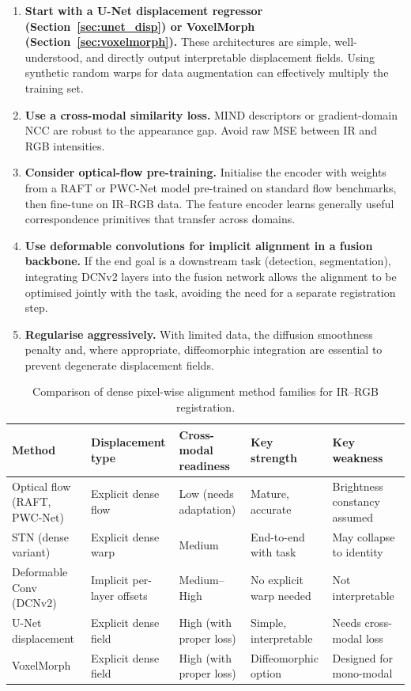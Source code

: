 \begin{enumerate}
    \item \textbf{Start with a U-Net displacement regressor
          (Section~\ref{sec:unet_disp}) or VoxelMorph
          (Section~\ref{sec:voxelmorph}).}  These architectures are
          simple, well-understood, and directly output interpretable
          displacement fields.  Using synthetic random warps for data
          augmentation can effectively multiply the training set.
    \item \textbf{Use a cross-modal similarity loss.}  MIND descriptors
          or gradient-domain NCC are robust to the appearance gap.
          Avoid raw MSE between IR and RGB intensities.
    \item \textbf{Consider optical-flow pre-training.}  Initialise the
          encoder with weights from a RAFT or PWC-Net model pre-trained
          on standard flow benchmarks, then fine-tune on IR--RGB data.
          The feature encoder learns generally useful correspondence
          primitives that transfer across domains.
    \item \textbf{Use deformable convolutions for implicit alignment
          in a fusion backbone.}  If the end goal is a downstream task
          (detection, segmentation), integrating DCNv2 layers into the
          fusion network allows the alignment to be optimised jointly
          with the task, avoiding the need for a separate registration
          step.
    \item \textbf{Regularise aggressively.}  With limited data, the
          diffusion smoothness penalty and, where appropriate,
          diffeomorphic integration are essential to prevent
          degenerate displacement fields.
\end{enumerate}

\begin{table}[t]
\centering
\caption{Comparison of dense pixel-wise alignment method families for
IR--RGB registration.}
\label{tab:method_comparison}
\small
\begin{tabular}{p{3.0cm} p{2.8cm} p{2.8cm} p{2.5cm} p{2.5cm}}
\hline
\textbf{Method} & \textbf{Displacement type} & \textbf{Cross-modal readiness} & \textbf{Key strength} & \textbf{Key weakness} \\
\hline
Optical flow (RAFT, PWC-Net) & Explicit dense flow & Low (needs adaptation) & Mature, accurate & Brightness constancy assumed \\
STN (dense variant) & Explicit dense warp & Medium & End-to-end with task & May collapse to identity \\
Deformable Conv (DCNv2) & Implicit per-layer offsets & Medium--High & No explicit warp needed & Not interpretable \\
U-Net displacement & Explicit dense field & High (with proper loss) & Simple, interpretable & Needs cross-modal loss \\
VoxelMorph & Explicit dense field & High (with proper loss) & Diffeomorphic option & Designed for mono-modal \\
\hline
\end{tabular}
\end{table}


